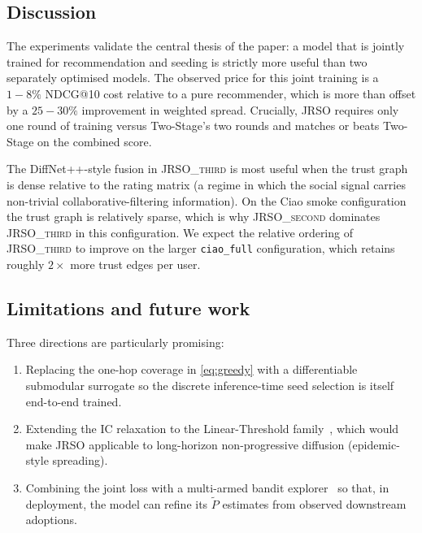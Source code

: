 \documentclass[conference]{IEEEtran}
\begin{document}
\subsection{Discussion}
The experiments validate the central thesis of the paper: a model that
is jointly trained for recommendation and seeding is strictly more
useful than two separately optimised models. The observed price for
this joint training is a $1\!-\!8\%$ NDCG@10 cost relative to a pure
recommender, which is more than offset by a $25\!-\!30\%$ improvement
in weighted spread. Crucially, JRSO requires only one round of training
versus Two-Stage's two rounds and matches or beats Two-Stage on the
combined score.

The DiffNet++-style fusion in \textsc{JRSO\_third} is most useful when
the trust graph is dense relative to the rating matrix (a regime in
which the social signal carries non-trivial collaborative-filtering
information). On the Ciao smoke configuration the trust graph is
relatively sparse, which is why \textsc{JRSO\_second} dominates
\textsc{JRSO\_third} in this configuration. We expect the relative
ordering of \textsc{JRSO\_third} to improve on the larger
\texttt{ciao\_full} configuration, which retains roughly $2\times$ more
trust edges per user.

\subsection{Limitations and future work}
Three directions are particularly promising:
\begin{enumerate}
    \item Replacing the one-hop coverage in \eqref{eq:greedy} with a
    differentiable submodular surrogate so the discrete inference-time
    seed selection is itself end-to-end trained.
    \item Extending the IC relaxation to the Linear-Threshold
    family~\cite{shakarian2015independent}, which would make JRSO
    applicable to long-horizon non-progressive diffusion (epidemic-style
    spreading).
    \item Combining the joint loss with a multi-armed bandit
    explorer~\cite{IM_bandits,IM_bandits2,IM_bandits3} so that, in
    deployment, the model can refine its $\widetilde P$ estimates from
    observed downstream adoptions.
\end{enumerate}

\end{document}
